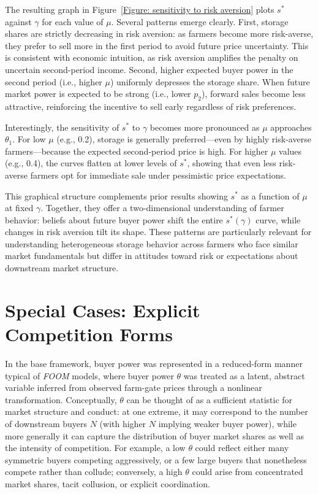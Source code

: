 The resulting graph in Figure~\ref{Figure: sensitivity to risk aversion} plots $s^*$ against $\gamma$ for each value of $\mu$. Several patterns emerge clearly. First, storage shares are strictly decreasing in risk aversion: as farmers become more risk-averse, they prefer to sell more in the first period to avoid future price uncertainty. This is consistent with economic intuition, as risk aversion amplifies the penalty on uncertain second-period income. Second, higher expected buyer power in the second period (i.e., higher $\mu$) uniformly depresses the storage share. When future market power is expected to be strong (i.e., lower $p_2$), forward sales become less attractive, reinforcing the incentive to sell early regardless of risk preferences.

Interestingly, the sensitivity of $s^*$ to $\gamma$ becomes more pronounced as $\mu$ approaches $\theta_1$. For low $\mu$ (e.g., 0.2), storage is generally preferred---even by highly risk-averse farmers---because the expected second-period price is high. For higher $\mu$ values (e.g., 0.4), the curves flatten at lower levels of $s^*$, showing that even less risk-averse farmers opt for immediate sale under pessimistic price expectations.

This graphical structure complements prior results showing $s^*$ as a function of $\mu$ at fixed $\gamma$. Together, they offer a two-dimensional understanding of farmer behavior: beliefs about future buyer power shift the entire $s^*(\gamma)$ curve, while changes in risk aversion tilt its shape. These patterns are particularly relevant for understanding heterogeneous storage behavior across farmers who face similar market fundamentals but differ in attitudes toward risk or expectations about downstream market structure.


\section{Special Cases: Explicit Competition Forms}
\noindent In the base framework, buyer power was represented in a reduced-form manner typical of \textit{FOOM} models, where buyer power $\theta$ was treated as a latent, abstract variable inferred from observed farm-gate prices through a nonlinear transformation. Conceptually, $\theta$ can be thought of as a sufficient statistic for market structure and conduct: at one extreme, it may correspond to the number of downstream buyers $N$ (with higher $N$ implying weaker buyer power), while more generally it can capture the distribution of buyer market shares as well as the intensity of competition. For example, a low $\theta$ could reflect either many symmetric buyers competing aggressively, or a few large buyers that nonetheless compete rather than collude; conversely, a high $\theta$ could arise from concentrated market shares, tacit collusion, or explicit coordination. 

